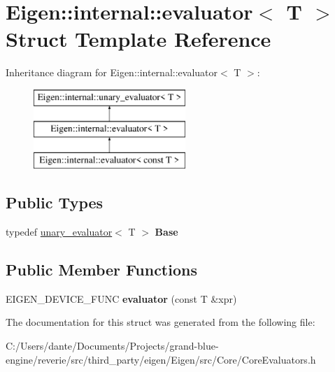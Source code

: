 \hypertarget{struct_eigen_1_1internal_1_1evaluator}{}\section{Eigen\+::internal\+::evaluator$<$ T $>$ Struct Template Reference}
\label{struct_eigen_1_1internal_1_1evaluator}
Inheritance diagram for Eigen\+::internal\+::evaluator$<$ T $>$\+:\begin{figure}[H]
\begin{center}
\leavevmode
\includegraphics[height=3.000000cm]{struct_eigen_1_1internal_1_1evaluator}
\end{center}
\end{figure}
\subsection*{Public Types}
\begin{DoxyCompactItemize}
\item 
\mbox{\label{struct_eigen_1_1internal_1_1evaluator_a23e380d87319deaa59368cdf3db87b2b}} 
typedef \mbox{\hyperlink{struct_eigen_1_1internal_1_1unary__evaluator}{unary\+\_\+evaluator}}$<$ T $>$ {\bfseries Base}
\end{DoxyCompactItemize}
\subsection*{Public Member Functions}
\begin{DoxyCompactItemize}
\item 
\mbox{\label{struct_eigen_1_1internal_1_1evaluator_a3225cac605136d04af9b333d97866a8b}} 
E\+I\+G\+E\+N\+\_\+\+D\+E\+V\+I\+C\+E\+\_\+\+F\+U\+NC {\bfseries evaluator} (const T \&xpr)
\end{DoxyCompactItemize}


The documentation for this struct was generated from the following file\+:\begin{DoxyCompactItemize}
\item 
C\+:/\+Users/dante/\+Documents/\+Projects/grand-\/blue-\/engine/reverie/src/third\+\_\+party/eigen/\+Eigen/src/\+Core/Core\+Evaluators.\+h\end{DoxyCompactItemize}
